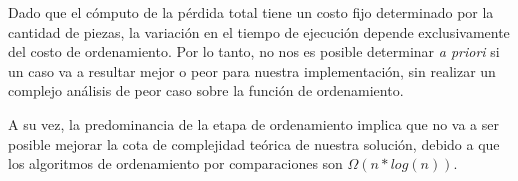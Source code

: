 Dado que el cómputo de la pérdida total tiene un costo fijo determinado por la cantidad de piezas, la variación en el tiempo de ejecución depende exclusivamente del costo de ordenamiento. Por lo tanto, no nos es posible determinar \emph{a priori} si un caso va a resultar mejor o peor para nuestra implementación, sin realizar un complejo análisis de peor caso sobre la función de ordenamiento.

A su vez, la predominancia de la etapa de ordenamiento implica que no va a ser posible mejorar la cota de complejidad teórica de nuestra solución, debido a que los algoritmos de ordenamiento por comparaciones son $\Omega(n * log(n))$.